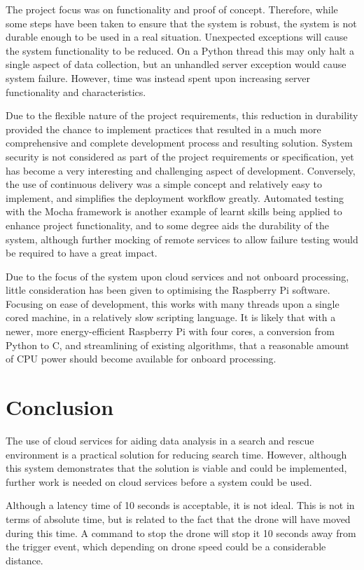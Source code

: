 \documentclass{article}
\begin{document}
The project focus was on functionality and proof of concept. Therefore, while some steps have been taken to ensure that the system is robust, the system is not durable enough to be used in a real situation. Unexpected exceptions will cause the system functionality to be reduced. On a Python thread this may only halt a single aspect of data collection, but an unhandled server exception would cause system failure. However, time was instead spent upon increasing server functionality and characteristics. 

Due to the flexible nature of the project requirements, this reduction in durability provided the chance to implement practices that resulted in a much more comprehensive and complete development process and resulting solution. System security is not considered as part of the project requirements or specification, yet has become a very interesting and challenging aspect of development. Conversely, the use of continuous delivery was a simple concept and relatively easy to implement, and simplifies the deployment workflow greatly. Automated testing with the Mocha framework is another example of learnt skills being applied to enhance project functionality, and to some degree aids the durability of the system, although further mocking of remote services to allow failure testing would be required to have a great impact.

Due to the focus of the system upon cloud services and not onboard processing, little consideration has been given to optimising the Raspberry Pi software. Focusing on ease of development, this works with many threads upon a single cored machine, in a relatively slow scripting language. It is likely that with a newer, more energy-efficient Raspberry Pi with four cores, a conversion from Python to C, and streamlining of existing algorithms, that a reasonable amount of CPU power should become available for onboard processing.

\section{Conclusion}

The use of cloud services for aiding data analysis in a search and rescue environment is a practical solution for reducing search time. However, although this system demonstrates that the solution is viable and could be implemented, further work is needed on cloud services before a system could be used. 

Although a latency time of 10 seconds is acceptable, it is not ideal. This is not in terms of absolute time, but is related to the fact that the drone will have moved during this time. A command to stop the drone will stop it 10 seconds away from the trigger event, which depending on drone speed could be a considerable distance. 
\end{document}
